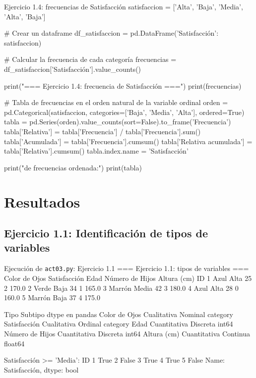 \documentclass[11pt,letterpaper]{article}
\begin{document}
\begin{codigo}[label=cod:ej14]{Ejercicio 1.4: frecuencias de Satisfacción}
satisfaccion = ['Alta', 'Baja', 'Media', 'Alta', 'Baja']

# Crear un dataframe
df_satisfaccion = pd.DataFrame({'Satisfacción': satisfaccion})

# Calcular la frecuencia de cada categoría
frecuencias = df_satisfaccion['Satisfacción'].value_counts()

print("\n=== Ejercicio 1.4: frecuencia de Satisfacción ===")
print(frecuencias)

# Tabla de frecuencias en el orden natural de la variable ordinal
orden = pd.Categorical(satisfaccion, categories=['Baja', 'Media', 'Alta'], ordered=True)
tabla = pd.Series(orden).value_counts(sort=False).to_frame('Frecuencia')
tabla['Relativa'] = tabla['Frecuencia'] / tabla['Frecuencia'].sum()
tabla['Acumulada'] = tabla['Frecuencia'].cumsum()
tabla['Relativa acumulada'] = tabla['Relativa'].cumsum()
tabla.index.name = 'Satisfacción'

print("\nTabla de frecuencias ordenada:")
print(tabla)
\end{codigo}

\section{Resultados}

\subsection{Ejercicio 1.1: Identificación de tipos de variables}

\begin{consola}[label=out:ej11]{Ejecución de \texttt{act03.py}: Ejercicio 1.1}
=== Ejercicio 1.1: tipos de variables ===
   Color de Ojos Satisfacción  Edad  Número de Hijos  Altura (cm)
ID
1           Azul         Alta    25                2        170.0
2          Verde         Baja    34                1        165.0
3         Marrón        Media    42                3        180.0
4           Azul         Alta    28                0        160.0
5         Marrón         Baja    37                4        175.0

                         Tipo   Subtipo dtype en pandas
Color de Ojos     Cualitativa   Nominal        category
Satisfacción      Cualitativa   Ordinal        category
Edad             Cuantitativa  Discreta           int64
Número de Hijos  Cuantitativa  Discreta           int64
Altura (cm)      Cuantitativa  Continua         float64

Satisfacción >= 'Media':
ID
1     True
2    False
3     True
4     True
5    False
Name: Satisfacción, dtype: bool
\end{consola}
\end{document}
